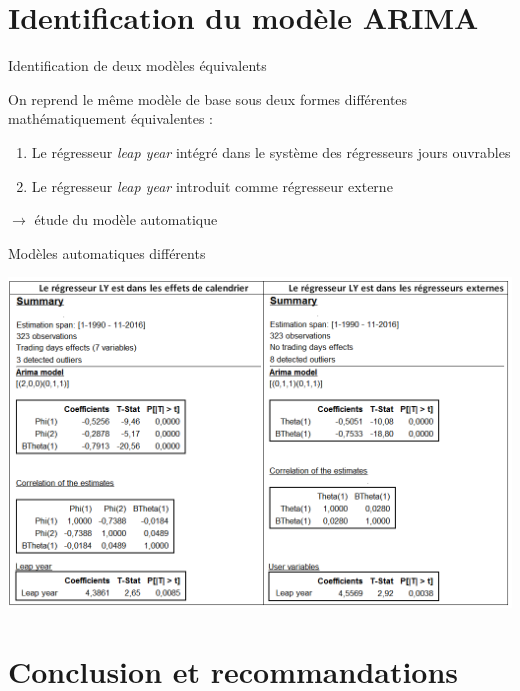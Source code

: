\documentclass[10pt,xcolor=table,color={dvipsnames,usenames},ignorenonframetext,usepdftitle=false,french]{beamer}
\begin{document}
\section{Identification du modèle
ARIMA}\label{identification-du-modele-arima}

\begin{frame}{Identification de deux modèles équivalents}

On reprend le même modèle de base sous deux formes différentes
mathématiquement équivalentes :

\begin{enumerate}
\def\labelenumi{\arabic{enumi}.}
\item
  Le régresseur \emph{leap year} intégré dans le système des régresseurs
  jours ouvrables
\item
  Le régresseur \emph{leap year} introduit comme régresseur externe
\end{enumerate}

\(\rightarrow\) étude du modèle automatique

\end{frame}

\begin{frame}{Modèles automatiques différents}

\centering
\includegraphics[width = \textwidth]{img/CholeskyRF241.png}

\end{frame}

\section{Conclusion et
recommandations}\label{conclusion-et-recommandations}
\end{document}
